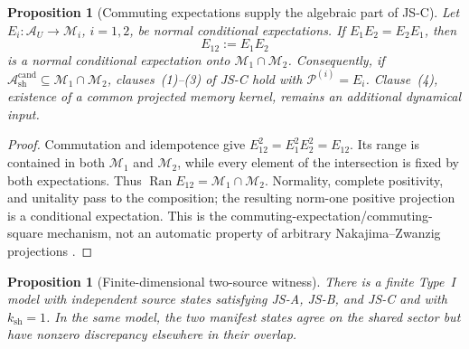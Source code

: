 \documentclass[12pt]{article}
\newtheorem{proposition}[theorem]{Proposition}
\theoremstyle{definition}
\theoremstyle{remark}
\begin{document}
\begin{proposition}[Commuting expectations supply the algebraic part of
JS-C]\label{prop:commuting_square}
Let \(E_i:\mathcal A_U\to\mathcal M_i\), \(i=1,2\), be normal
conditional expectations. If \(E_1E_2=E_2E_1\), then
\[
E_{12}:=E_1E_2
\]
is a normal conditional expectation onto
\(\mathcal M_1\cap\mathcal M_2\). Consequently, if
\(\mathcal A_{\mathrm{sh}}^{\mathrm{cand}}\subseteq
\mathcal M_1\cap\mathcal M_2\), clauses~(1)--(3) of JS-C hold with
\(\mathcal P^{(i)}=E_i\). Clause~(4), existence of a common projected
memory kernel, remains an additional dynamical input.
\end{proposition}

\begin{proof}
Commutation and idempotence give
\(E_{12}^2=E_1^2E_2^2=E_{12}\). Its range is contained in both
\(\mathcal M_1\) and \(\mathcal M_2\), while every element of the
intersection is fixed by both expectations. Thus
\(\operatorname{Ran}E_{12}=\mathcal M_1\cap\mathcal M_2\).
Normality, complete positivity, and unitality pass to the composition;
the resulting norm-one positive projection is a conditional expectation.
This is the commuting-expectation/commuting-square mechanism, not an
automatic property of arbitrary Nakajima--Zwanzig projections
\cite{AccardiCecchini1982,Popa1983}.
\end{proof}

\begin{proposition}[Finite-dimensional two-source witness]
\label{prop:fdwitness}
There is a finite Type~I model with independent source states satisfying
JS-A, JS-B, and JS-C and with \(k_{\mathrm{sh}}=1\). In the same model,
the two manifest states agree on the shared sector but have nonzero
discrepancy elsewhere in their overlap.
\end{proposition}
\end{document}
